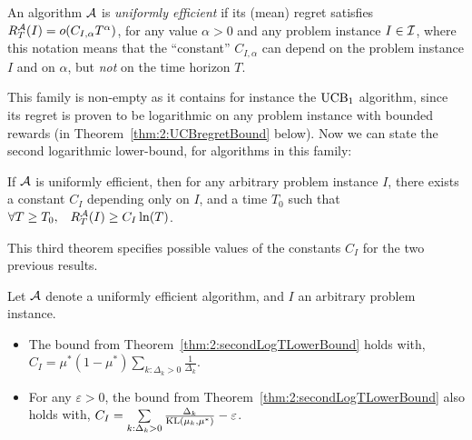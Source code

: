 \begin{definition}\label{def:2:uniformlyEfficientAlgorithm}
\begin{leftbar}[defnbar]  %
    An algorithm $\mathcal{A}$ is \emph{uniformly efficient} if its (mean) regret satisfies
    $R_T^{\mathcal{A}}(I) = \mathop{}\mathopen{}o\mathopen{}\left(C_{I,\alpha} T^{\alpha}\right)$,
    for any value $\alpha>0$ and any problem instance $I\in \mathcal{I}$,
    where this notation means that the ``constant'' $C_{I,\alpha}$ can depend on the problem instance $I$ and on $\alpha$, but \emph{not} on the time horizon $T$.
\end{leftbar}  %
\end{definition}

This family is non-empty as it contains for instance the $\mathrm{UCB}_1$ algorithm, since its regret is proven to be logarithmic on any problem instance with bounded rewards (in Theorem~\ref{thm:2:UCBregretBound} below).
Now we can state the second logarithmic lower-bound, for algorithms in this family:

\begin{theorem}\label{thm:2:secondLogTLowerBound}
\begin{leftbar}[theorembar]  %
    If $\mathcal{A}$ is uniformly efficient,
    then for any arbitrary problem instance $I$,
    there exists a constant $C_I$ depending only on $I$,
    and a time $T_0$ such that $\forall T \geq T_0, \;\;\; R_T^{\mathcal{A}}(I) \geq C_I \ln(T)$.
\end{leftbar}  %
\end{theorem}

This third theorem specifies possible values of the constants $C_I$ for the two previous results.

\begin{theorem}\label{thm:2:forSecondLogTLowerBound}
\begin{leftbarnospace}[theorembar]  %
    Let $\mathcal{A}$ denote a uniformly efficient algorithm,
    and $I$ an arbitrary problem instance.
    \begin{itemize}
        \item
        The bound from Theorem~\ref{thm:2:secondLogTLowerBound} holds with,
        $C_I = \mu^* (1 - \mu^*) \sum\limits_{k: \Delta_k > 0} \frac{1}{\Delta_k}$.
        \item
        For any $\varepsilon>0$, the bound from Theorem~\ref{thm:2:secondLogTLowerBound} also holds with,
        $C_I = \sum\limits_{k: \Delta_k > 0} \frac{\Delta_k}{\mathrm{KL}(\mu_k, \mu^*)} - \varepsilon$.
    \end{itemize}
\end{leftbarnospace}  %
\end{theorem}

